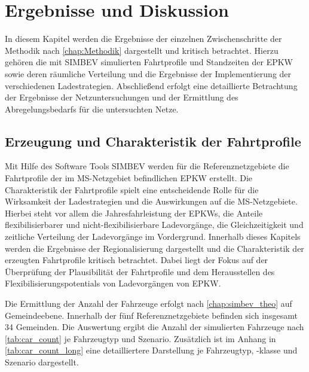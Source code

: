 \section{Ergebnisse und Diskussion}\label{chap:results}

In diesem Kapitel werden die Ergebnisse der einzelnen Zwischenschritte der Methodik nach \autoref{chap:Methodik} dargestellt und kritisch betrachtet.
Hierzu gehören die mit \gls{SIMBEV} simulierten Fahrtprofile und Standzeiten der \gls{EPKW} sowie deren räumliche Verteilung und die Ergebnisse der Implementierung der verschiedenen Ladestrategien.
Abschließend erfolgt eine detaillierte Betrachtung der Ergebnisse der Netzuntersuchungen und der Ermittlung des Abregelungsbedarfs für die untersuchten Netze.


\subsection{Erzeugung und Charakteristik der Fahrtprofile}

Mit Hilfe des Software Tools \gls{SIMBEV} werden für die Referenznetzgebiete die Fahrtprofile der im \gls{MS}-Netzgebiet befindlichen \gls{EPKW} erstellt.
Die Charakteristik der Fahrtprofile spielt eine entscheidende Rolle für die Wirksamkeit der Ladestrategien und die Auswirkungen auf die \gls{MS}-Netzgebiete.
Hierbei steht vor allem die Jahresfahrleistung der \glspl{EPKW}, die Anteile flexibilisierbarer und nicht-flexibilisierbare Ladevorgänge, die Gleichzeitigkeit und zeitliche Verteilung der Ladevorgänge im Vordergrund.
Innerhalb dieses Kapitels werden die Ergebnisse der Regionalisierung dargestellt und die Charakteristik der erzeugten Fahrtprofile kritisch betrachtet.
Dabei liegt der Fokus auf der Überprüfung der Plausibilität der Fahrtprofile und dem Herausstellen des Flexibilisierungspotentials von Ladevorgängen von \gls{EPKW}.\medskip

Die Ermittlung der Anzahl der Fahrzeuge erfolgt nach \autoref{chap:simbev_theo} auf Gemeindeebene.
Innerhalb der fünf Referenznetzgebiete befinden sich insgesamt \num{34} Gemeinden.
Die Auswertung ergibt die Anzahl der simulierten Fahrzeuge nach \autoref{tab:car_count} je Fahrzeugtyp und Szenario.
Zusätzlich ist im Anhang in \autoref{tab:car_count_long} eine detailliertere Darstellung je Fahrzeugtyp, -klasse und Szenario dargestellt.



